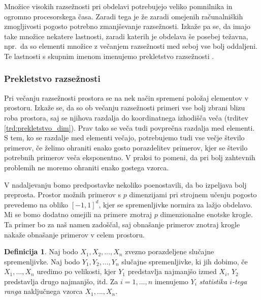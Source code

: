 \documentclass[12pt,a4paper,twoside]{article}
\theoremstyle{definition} %
\newtheorem{definicija}{Definicija}[section]
\theoremstyle{plain} %
\numberwithin{equation}{section}  %
\begin{document}
Množice visokih razsežnosti pri obdelavi potrebujejo veliko pomnilnika in ogromno procesorskega časa. 
Zaradi tega je že zaradi omejenih računalniških zmogljivosti pogosto potrebno zmanjševanje razsežnosti. 
Izkaže pa se, da imajo take množice nekatere lastnosti, zaradi katerih je obdelava še posebej težavna, 
npr.\ da so elementi množice z večanjem razsežnosti med seboj vse bolj oddaljeni. 
Te lastnosti s skupnim imenom imenujemo prekletstvo razsežnosti \cite{bellman2015adaptive}. %



\subsubsection{Prekletstvo razsežnosti}

Pri večanju razsežnosti prostora se na nek način spremeni položaj elementov v prostoru. 
Izkaže se, da so ob večanju razsežnosti primeri vse bolj zbrani blizu roba prostora, saj se njihova razdalja do koordinatnega izhodišča veča (trditev \ref{trd:prekletstvo_dim}). 
Prav tako se veča tudi povprečna razdalja med elementi. %
S tem, ko se razdalje med elementi večajo, potrebujemo tudi vse večje število primerov, če želimo ohraniti enako gosto porazdelitev primerov, kjer se število potrebnih primerov veča eksponentno. 
V praksi to pomeni, da pri bolj zahtevnih problemih ne moremo ohraniti enako gostega vzorca. 

V nadaljevanju bomo predpostavke nekoliko poenostavili, da bo izpeljava bolj preprosta. 
Prostor možnih primerov s $p$ dimenzijami pri strojnem učenju pogosto prevedemo na obliko $[-1, 1]^d$, kjer se spremenljivke normira za lažjo obdelavo. 
Mi se bomo dodatno omejili na primere znotraj $p$ dimenzionalne enotske krogle. 
Ta primer bo za naš namen zadoščal, saj obnašanje primerov znotraj krogle nakaže obnašanje primerov v celem prostoru.


\begin{definicija}
\label{def:statistika}
	Naj bodo $X_1, X_2, \ldots, X_n$ zvezno porazdeljene slučajne spremenljivke.
	Naj bodo $Y_1, Y_2, \ldots, Y_n$ slučajne spremenljivke, ki jih dobimo, če $X_1, \ldots, X_n$ uredimo po velikosti, kjer $Y_1$ predstavlja najmanjšo izmed $X_i$, $Y_2$ predstavlja drugo najmanjšo, itd.
	Za $i=1,\ldots,n$ imenujemo $Y_i$ \emph{statistika $i$-tega ranga} naključnega vzorca $X_1, \ldots, X_n$.
\end{definicija}
\end{document}
